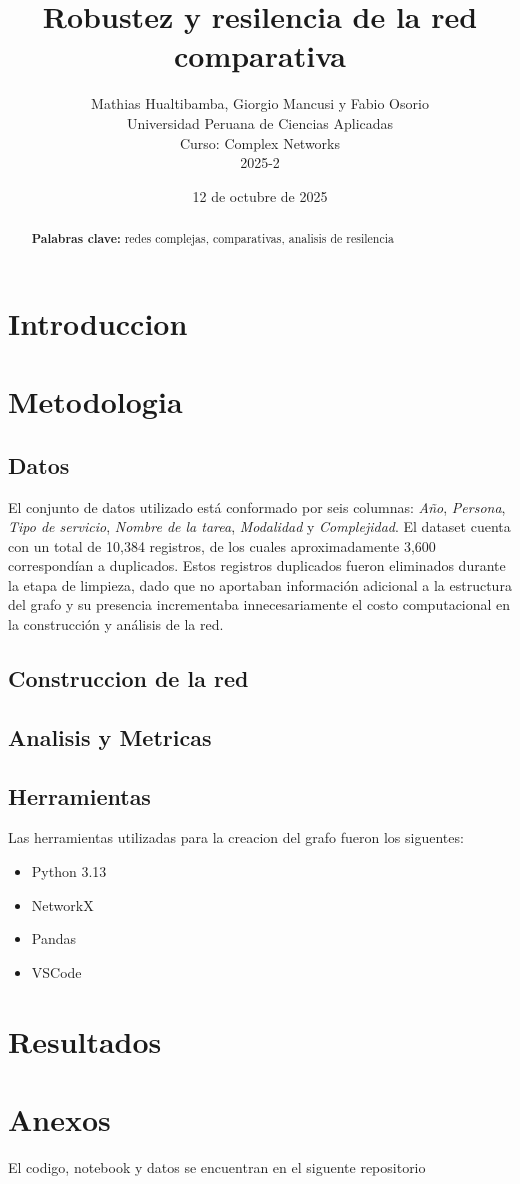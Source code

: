 \documentclass[twocolumn]{article}
\title{Robustez y resilencia de la red comparativa}
\author{
    Mathias Hualtibamba, Giorgio Mancusi y Fabio Osorio \\
    Universidad Peruana de Ciencias Aplicadas \\
    Curso: Complex Networks \\
    2025-2 
}
\date{12 de octubre de 2025}
\newcommand{\keywords}[1]{\par\noindent\textbf{Palabras clave:} #1}
\begin{document}
\maketitle

\begin{abstract}
\blindtext[1]
\keywords{redes complejas, comparativas, analisis de resilencia}
\end{abstract}

\section{Introduccion}
\blindtext[2]

\section{Metodologia}
\blindtext[3]

\subsection{Datos}
El conjunto de datos utilizado está conformado por seis columnas: \textit{Año}, \textit{Persona}, \textit{Tipo de servicio}, \textit{Nombre de la tarea}, \textit{Modalidad} y \textit{Complejidad}. 
El dataset cuenta con un total de 10,384 registros, de los cuales aproximadamente 3,600 correspondían a duplicados. 
Estos registros duplicados fueron eliminados durante la etapa de limpieza, dado que no aportaban información adicional a la estructura del grafo y su presencia incrementaba innecesariamente el costo computacional en la construcción y análisis de la red.

\subsection{Construccion de la red}
\blindtext[1]

\subsection{Analisis y Metricas}
\blindtext[1]

\subsection{Herramientas}
Las herramientas utilizadas para la creacion del grafo fueron los siguentes:
\begin{itemize}
    \item Python 3.13
    \item NetworkX
    \item Pandas
    \item VSCode
\end{itemize}

\section{Resultados}
\blindtext[4]

\printbibliography

\section{Anexos}
El codigo, notebook y datos se encuentran en el siguente repositorio \parencite{repoCodigo}
\end{document}
